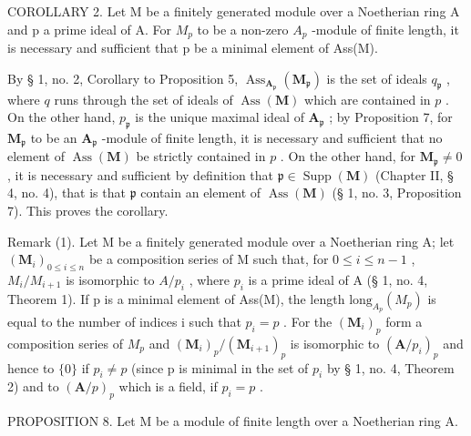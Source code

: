 COROLLARY 2. Let M be a finitely generated module over a Noetherian ring A and p a prime ideal of A. For \(M_{p}\) to be a non-zero \(A_{p}\) -module of finite length, it is necessary and sufficient that p be a minimal element of Ass(M).

By § 1, no. 2, Corollary to Proposition 5, \(\operatorname{Ass}_{\mathbf{A}_{\mathfrak{p}}}(\mathbf{M}_{\mathfrak{p}})\) is the set of ideals \(q_{\mathfrak{p}}\) , where \(q\) runs through the set of ideals of \(\operatorname{Ass}(\mathbf{M})\) which are contained in \(p\) . On the other hand, \(p_{\mathfrak{p}}\) is the unique maximal ideal of \(\mathbf{A}_{\mathfrak{p}}\) ; by Proposition 7, for \(\mathbf{M}_{\mathfrak{p}}\) to be an \(\mathbf{A}_{\mathfrak{p}}\) -module of finite length, it is necessary and sufficient that no element of \(\operatorname{Ass}(\mathbf{M})\) be strictly contained in \(p\) . On the other hand, for \(\mathbf{M}_{\mathfrak{p}} \neq 0\) , it is necessary and sufficient by definition that \(\mathfrak{p} \in \operatorname{Supp}(\mathbf{M})\) (Chapter II, § 4, no. 4), that is that \(\mathfrak{p}\) contain an element of \(\operatorname{Ass}(\mathbf{M})\) (§ 1, no. 3, Proposition 7). This proves the corollary.

Remark (1). Let M be a finitely generated module over a Noetherian ring A; let \((\mathbf{M}_{i})_{0\leqslant i\leqslant n}\) be a composition series of M such that, for \(0\leqslant i\leqslant n-1\) , \(M_{i}/M_{i+1}\) is isomorphic to \(A/p_{i}\) , where \(p_{i}\) is a prime ideal of A (§ 1, no. 4, Theorem 1). If p is a minimal element of Ass(M), the length \(\text{long}_{A_{p}}(M_{p})\) is equal to the number of indices i such that \(p_{i}=p\) . For the \((\mathbf{M}_{i})_{p}\) form a composition series of \(M_{p}\) and \((\mathbf{M}_{i})_{p}/(\mathbf{M}_{i+1})_{p}\) is isomorphic to \((\mathbf{A}/p_{i})_{p}\) and hence to \(\{0\}\) if \(p_{i}\neq p\) (since p is minimal in the set of \(p_{i}\) by § 1, no. 4, Theorem 2) and to \((\mathbf{A}/p)_{p}\) which is a field, if \(p_{i}=p\) .

PROPOSITION 8. Let M be a module of finite length over a Noetherian ring A.

